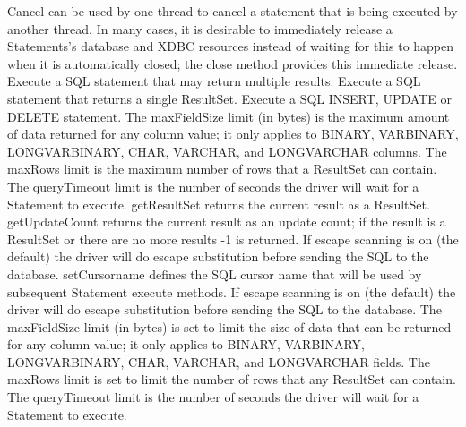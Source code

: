 \begin{description}

     Cancel can be used by one thread to cancel a statement that is being executed by another thread. 
     In many cases, it is desirable to immediately release a Statements's database and XDBC resources instead of waiting for this to
     happen when it is automatically closed; the close method provides this immediate release. 
     Execute a SQL statement that may return multiple results. 
     Execute a SQL statement that returns a single ResultSet. 
     Execute a SQL INSERT, UPDATE or DELETE statement. 
     The maxFieldSize limit (in bytes) is the maximum amount of data returned for any column value; it only applies to BINARY,
     VARBINARY, LONGVARBINARY, CHAR, VARCHAR, and LONGVARCHAR columns. 
     The maxRows limit is the maximum number of rows that a ResultSet can contain. 
     The queryTimeout limit is the number of seconds the driver will wait for a Statement to execute. 
     getResultSet returns the current result as a ResultSet. 
     getUpdateCount returns the current result as an update count; if the result is a ResultSet or there are no more results -1 is returned. 
     If escape scanning is on (the default) the driver will do escape substitution before sending the SQL to the database. 
     setCursorname defines the SQL cursor name that will be used by subsequent Statement execute methods. 
     If escape scanning is on (the default) the driver will do escape substitution before sending the SQL to the database. 
     The maxFieldSize limit (in bytes) is set to limit the size of data that can be returned for any column value; it only applies to BINARY,
     VARBINARY, LONGVARBINARY, CHAR, VARCHAR, and LONGVARCHAR fields. 
     The maxRows limit is set to limit the number of rows that any ResultSet can contain. 
     The queryTimeout limit is the number of seconds the driver will wait for a Statement to execute. 
\end{description}

                    

